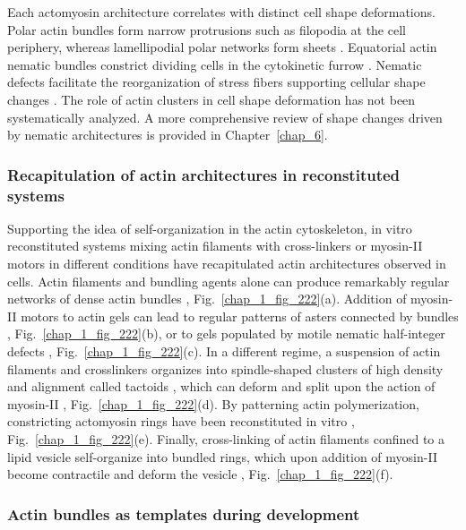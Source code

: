 Each actomyosin architecture correlates with distinct cell shape deformations. Polar actin bundles form narrow protrusions such as filopodia at the cell periphery, whereas lamellipodial polar networks form sheets \cite{blanchoin2014}. Equatorial actin nematic bundles constrict  dividing cells in the cytokinetic furrow \cite{anne2016}. Nematic defects  facilitate the reorganization of stress fibers supporting cellular shape changes \cite{schakenraad2020}. The role of actin clusters in cell shape deformation has not been systematically analyzed. A more comprehensive review of shape changes driven by nematic architectures is provided in Chapter~\ref{chap_6}.



\subsubsection{Recapitulation of actin architectures in reconstituted systems}

Supporting the idea of self-organization in the actin cytoskeleton, in vitro reconstituted systems mixing actin filaments with cross-linkers or myosin-II motors in different conditions have recapitulated actin architectures observed in cells. Actin filaments and bundling agents alone can produce remarkably regular networks of dense actin bundles  \cite{huber20152}, Fig.~\ref{chap_1_fig_222}(a). Addition of myosin-II motors to actin gels can lead to regular patterns of asters connected by bundles \cite{murrell2012,seara2018}, Fig.~\ref{chap_1_fig_222}(b), or to gels populated by motile nematic half-integer defects \cite{kumar2018,seara2018}, Fig.~\ref{chap_1_fig_222}(c). In a different regime, a suspension of actin filaments and crosslinkers organizes into spindle-shaped clusters of high density and alignment called tactoids \cite{weirich2017}, which can deform and split upon the action of myosin-II \cite{weirich2019}, Fig.~\ref{chap_1_fig_222}(d). By patterning actin polymerization, constricting actomyosin rings have been reconstituted in vitro  \cite{Ennomani2016}, Fig.~\ref{chap_1_fig_222}(e). Finally, cross-linking of actin filaments confined to a lipid vesicle self-organize into bundled rings, which upon addition of myosin-II become contractile and deform the vesicle \cite{bashirzadeh2022, litschel2021}, Fig.~\ref{chap_1_fig_222}(f).


\subsubsection{Actin bundles as templates during development}

